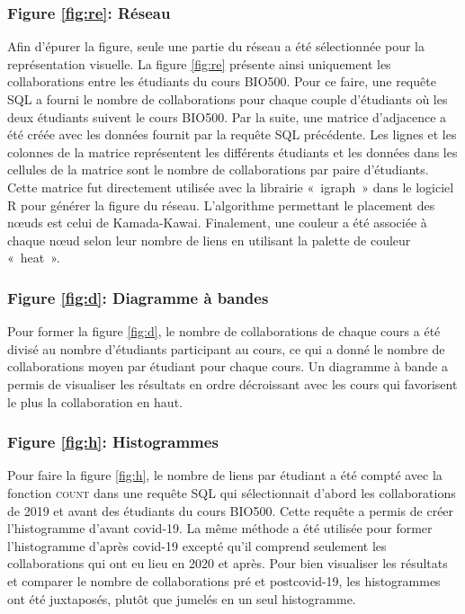 \documentclass{article}
\begin{document}
\subsubsection*{Figure \ref{fig:re}: Réseau}
    Afin d’épurer la figure, seule une partie du réseau a été sélectionnée pour la représentation visuelle. La figure \ref{fig:re} présente ainsi uniquement les collaborations entre les étudiants du cours BIO500. Pour ce faire, une requête SQL a fourni le nombre de collaborations pour chaque couple d'étudiants où les deux étudiants suivent le cours BIO500. Par la suite, une matrice d’adjacence a été créée avec les données fournit par la requête SQL précédente. Les lignes et les colonnes de la matrice représentent les différents étudiants et les données dans les cellules de la matrice sont le nombre de collaborations par paire d’étudiants. Cette matrice fut directement utilisée avec la librairie « igraph » dans le logiciel R pour générer la figure du réseau. L’algorithme permettant le placement des nœuds est celui de Kamada-Kawai. Finalement, une couleur a été associée à chaque nœud selon leur nombre de liens en utilisant la palette de couleur « heat ».
\subsubsection*{Figure \ref{fig:d}: Diagramme à bandes}
    Pour former la figure \ref{fig:d}, le nombre de collaborations de chaque cours a été divisé au nombre d’étudiants participant au cours, ce qui a donné le nombre de collaborations moyen par étudiant pour chaque cours. Un diagramme à bande a permis de visualiser les résultats en ordre décroissant avec les cours qui favorisent le plus la collaboration en haut.
\subsubsection*{Figure \ref{fig:h}: Histogrammes}
    Pour faire la figure \ref{fig:h}, le nombre de liens par étudiant a été compté avec la fonction \textsc{count} dans une requête SQL qui sélectionnait d’abord les collaborations de 2019 et avant des étudiants du cours BIO500. Cette requête a permis de créer l’histogramme d’avant covid-19. La même méthode a été utilisée pour former l’histogramme d’après covid-19 excepté qu’il comprend seulement les collaborations qui ont eu lieu en 2020 et après. Pour bien visualiser les résultats et comparer le nombre de collaborations pré et postcovid-19, les histogrammes ont été juxtaposés, plutôt que jumelés en un seul histogramme.
\end{document}
